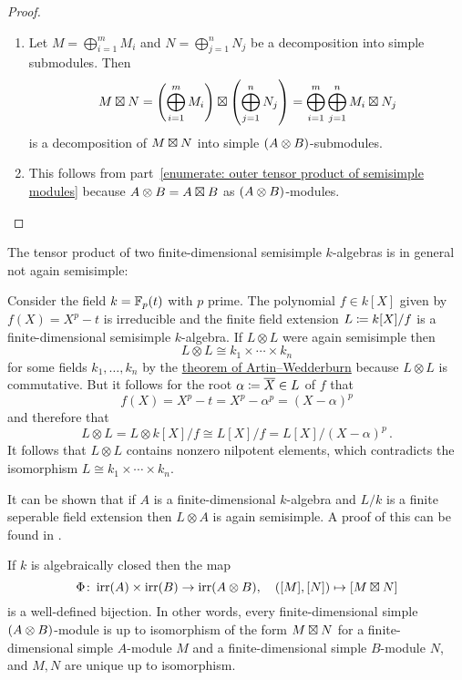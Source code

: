 \begin{proof}
  \leavevmode
  \begin{enumerate}
    \item
      Let $M = \bigoplus_{i=1}^m M_i$ and $N = \bigoplus_{j=1}^n N_j$ be a decomposition into simple submodules.
      Then
      \[
          M \mathbin{\boxtimes} N
        = \left( \bigoplus_{i=1}^m M_i \right) \mathbin{\boxtimes} \left( \bigoplus_{j=1}^n N_j \right)
        = \bigoplus_{i=1}^m \bigoplus_{j=1}^n M_i \mathbin{\boxtimes} N_j
      \]
      is a decomposition of $M \mathbin{\boxtimes} N$ into simple $(A \mathbin{\otimes} B)$-submodules.
    \item
      This follows from part~\ref*{enumerate: outer tensor product of semisimple modules} because $A \mathbin{\otimes} B = A \mathbin{\boxtimes} B$ as $(A \mathbin{\otimes} B)$-modules.
    \qedhere
  \end{enumerate}
\end{proof}


\begin{warning}
  The tensor product of two finite-dimensional semisimple $k$-algebras is in general not again semisimple:
  
  Consider the field $k = \mathbb{F}_p(t)$ with $p$ prime.
  The polynomial $f \in k[X]$ given by $f(X) = X^p - t$ is irreducible and the finite field extension $L \coloneqq k[X]/f$ is a finite-dimensional semisimple $k$-algebra.
  If $L \otimes L$ were again semisimple then
  \[
          L \otimes L
    \cong k_1 \times \dotsb \times k_n
  \]
  for some fields $k_1, \dotsc, k_n$ by the \hyperref[theorem: artin wedderburn theorem]{theorem of Artin--Wedderburn} because $L \otimes L$ is commutative.
  But it follows for the root $\alpha \coloneqq \overline{X} \in L$ of $f$ that
  \[
      f(X)
    = X^p - t
    = X^p - \alpha^p
    = (X - \alpha)^p
  \]
  and therefore that
  \[
          L \otimes L
    =     L \otimes k[X]/f
    \cong L[X]/f
    =     L[X]/(X-\alpha)^p \,.
  \]
  It follows that $L \otimes L$ contains nonzero nilpotent elements, which contradicts the isomorphism $L \cong k_1 \times \dotsb \times k_n$.
\end{warning}


\begin{remark}
  It can be shown that if $A$ is a finite-dimensional $k$-algebra and $L/k$ is a finite seperable field extension then $L \otimes A$ is again semisimple.
  A proof of this can be found in \cite[XVII, Theorem~6.2]{LangAlgebra2005}.
\end{remark}


\begin{theorem}
  \label{theorem: simple modules over tensor products}
  If $k$ is algebraically closed then the map
  \[
            \Phi
    \colon  \operatorname{irr}(A) \times \operatorname{irr}(B)
    \to     \operatorname{irr}(A \mathbin{\otimes} B),
    \quad   ([M],[N])
    \mapsto [M \mathbin{\boxtimes} N]
  \]
  is a well-defined bijection.
  In other words, every finite-dimensional simple $(A \mathbin{\otimes} B)$-module is up to isomorphism of the form $M \mathbin{\boxtimes} N$ for a finite-dimensional simple $A$-module $M$ and a finite-dimensional simple $B$-module $N$, and $M, N$ are unique up to isomorphism.
\end{theorem}


